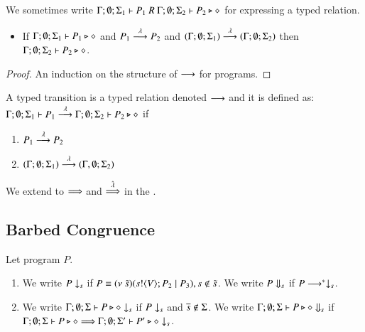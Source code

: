 We sometimes write $\Gamma; \emptyset; \Sigma_1 \vdash P_1\ R\ \Gamma; \emptyset; \Sigma_2 \vdash P_2 \triangleright \diamond$
for expressing a typed relation.


\begin{lemma}[Invariant]
	\begin{itemize}
		\item	If $\Gamma; \emptyset; \Sigma_1 \vdash P_1 \triangleright \diamond$ and
			$P_1 \stackrel{\lambda}{\longrightarrow} P_2$ and $(\Gamma; \emptyset; \Sigma_1) \stackrel{\lambda}{\longrightarrow} (\Gamma; \emptyset; \Sigma_2)$
			then $\Gamma; \emptyset; \Sigma_2 \vdash P_2 \triangleright \diamond$.
	\end{itemize}
\end{lemma}

\begin{proof}
	An induction on the structure of $\longrightarrow$ for programs.
\end{proof}

\begin{definition}
	A typed transition is a typed relation denoted $\longrightarrow$ and it is defined as:
	$
		\Gamma; \emptyset; \Sigma_1 \vdash P_1 \stackrel{\lambda}{\longrightarrow} \Gamma; \emptyset; \Sigma_2 \vdash P_2 \triangleright \diamond
	$
	if
	\begin{enumerate}
		\item	$P_1 \stackrel{\lambda}{\longrightarrow} P_2$
		\item	$(\Gamma; \emptyset; \Sigma_1) \stackrel{\lambda}{\longrightarrow} (\Gamma, \emptyset; \Sigma_2)$
	\end{enumerate}
\end{definition}

We extend to $\stackrel{}{\Longrightarrow}$ and $\stackrel{\hat{\lambda}}{\Longrightarrow}$ in the .

\subsection{Barbed Congruence}

\begin{definition}[Barbs]
	Let program $P$.
	\begin{enumerate}

		\item	We write $P \downarrow_{s}$ if $P \equiv (\nu\ \tilde{s})(s ! \langle V \rangle ; P_2 \;|\; P_3), s \notin \tilde{s}$.
			We write $P \Downarrow_{s}$ if $P \longrightarrow^* \downarrow_{s}$.

		\item	We write $\Gamma; \emptyset; \Sigma \vdash P \triangleright \diamond \downarrow_{s}$ if $P \downarrow_{s}$ and $\overline{s} \notin \Sigma$.
			We write $\Gamma; \emptyset; \Sigma \vdash P \triangleright \diamond \Downarrow_{s}$ if $\Gamma; \emptyset; \Sigma \vdash P \triangleright \diamond \stackrel{}{\Longrightarrow} \Gamma; \emptyset; \Sigma' \vdash P' \triangleright \diamond \downarrow_{s}$.			
	\end{enumerate}
\end{definition}

